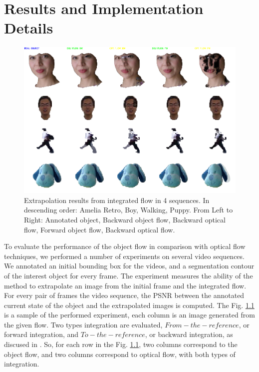 \chapter{Results and Implementation Details} \label{chap:results}


   \begin{figure}[th]
      \centering
      \includegraphics[width=1.0\textwidth]{../images/extrapolated.png}
      \caption{Extrapolation results from integrated flow in 4 sequences. In descending order: Amelia Retro, Boy, Walking, Puppy. From Left to Right: Annotated object, Backward object flow, Backward optical flow, Forward object flow, Backward optical flow.}
      \label{sample}
   \end{figure}
	\setlength{\belowcaptionskip}{-10pt}

To evaluate the performance of the object flow in comparison with optical flow techniques, we performed 
a number of experiments on several video sequences. We annotated an initial bounding box for the videos, 
and a segmentation contour of the interest object for every frame. The experiment measures the ability of the method to 
extrapolate an image from the initial frame and the integrated flow. For every pair of frames the video sequence, the PSNR between the annotated
current state of the object and the extrapolated images is computed. The Fig. \ref{sample} is a sample of the performed experiment, each column is an image generated from the given flow. 
Two types integration are evaluated, $From-the-reference$, or forward integration, and $To-the-reference$, or backward integration, as discused in \cite{c20}. So, for each row in the Fig. \ref{sample}, two columns correspond to the object flow, and two columns correspond to optical flow, with both types of integration.

